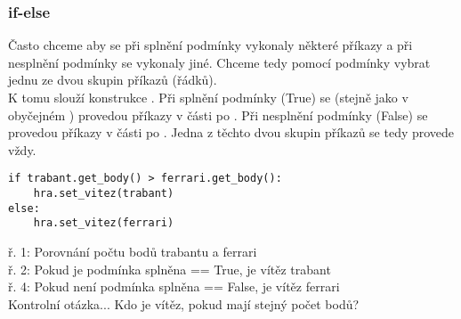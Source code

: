 \subsubsection{if-else}
Často chceme aby se při splnění podmínky vykonaly některé příkazy a při nesplnění podmínky se vykonaly jiné. Chceme tedy pomocí podmínky vybrat jednu ze dvou skupin příkazů (řádků).\\
K tomu slouží konstrukce . Při splnění podmínky (True) se (stejně jako v obyčejném ) provedou příkazy v části po . Při nesplnění podmínky (False) se provedou příkazy v části po . Jedna z těchto dvou skupin příkazů se tedy provede vždy.\\
\begin{minipage}[t]{.45\textwidth}
\begin{code}
\begin{verbatim}
if trabant.get_body() > ferrari.get_body():
	hra.set_vitez(trabant)
else:
	hra.set_vitez(ferrari)
\end{verbatim}

\label{code:if_else}
\end{code}
\end{minipage}
\begin{minipage}[t]{.45\textwidth}
\vspace{.5cm}
ř. 1:	Porovnání počtu bodů trabantu a ferrari\\
ř. 2:	Pokud je podmínka splněna == True, je vítěz trabant\\
ř. 4:	Pokud není podmínka splněna == False, je vítěz ferrari\\
Kontrolní otázka... Kdo je vítěz, pokud mají stejný počet bodů?\\
\end{minipage}\\

